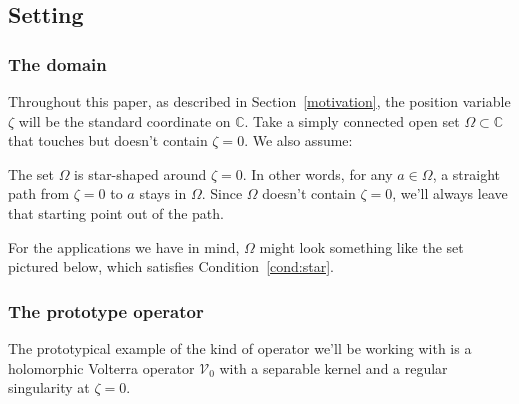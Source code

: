 \documentclass{article}
\makeatletter
\theoremstyle{plain}
\newcommand{\cond}[1]{\item[(\textsc{#1})]\protected@edef\@currentlabel{\textsc{#1}}}
\newcommand{\C}{\mathbb{C}}
\newcommand{\hardpart}{\mathcal{V}_0}
\newcommand{\domain}{\Omega}
\makeatother
\begin{document}
\subsection{Setting}\label{setting}
\subsubsection{The domain}\label{setting:domain}
Throughout this paper, as described in Section~\ref{motivation}, the position variable $\zeta$ will be the standard coordinate on $\C$. Take a simply connected open set $\domain \subset \C$ that touches but doesn't contain $\zeta = 0$. We also assume:
\begin{conditions}
\cond{star}\label{cond:star} The set $\domain$ is star-shaped around $\zeta = 0$. In other words, for any $a \in \domain$, a straight path from $\zeta = 0$ to $a$ stays in $\domain$. Since $\domain$ doesn't contain $\zeta = 0$, we'll always leave that starting point out of the path.
\end{conditions}
For the applications we have in mind, $\domain$ might look something like the set pictured below, which satisfies Condition~\eqref{cond:star}.
\begin{center}
\end{center}
\subsubsection{The prototype operator}\label{setting:basic}
The prototypical example of the kind of operator we'll be working with is a holomorphic Volterra operator $\hardpart$ with a separable kernel and a regular singularity at $\zeta = 0$.
\end{document}
